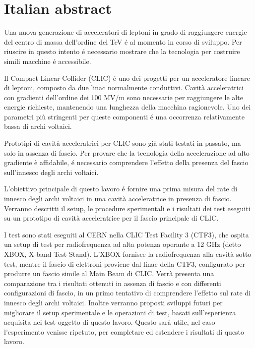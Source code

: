 \chapter*{Italian abstract}

Una nuova generazione di acceleratori di leptoni in grado di raggiungere energie del centro di massa dell'ordine del TeV é al momento in corso di sviluppo. Per riuscire in questo intento é necessario mostrare che la tecnologia per costruire simili macchine é accessibile.

Il Compact Linear Collider (CLIC) é uno dei progetti per un acceleratore lineare di leptoni, composto da due linac normalmente conduttivi. Cavit\`a acceleratrici con gradienti dell'ordine dei 100 MV/m sono necessarie per raggiungere le alte energie richieste, mantenendo una lunghezza della macchina ragionevole. Uno dei parametri pi\`u stringenti per queste componenti é una occorrenza relativamente bassa di archi voltaici.

Prototipi di cavit\`a acceleratrici per CLIC sono gi\`a stati testati in passato, ma solo in assenza di fascio. Per provare che la tecnologia della accelerazione ad alto gradiente \`e affidabile, é necessario comprendere l'effetto della presenza del fascio sull'innesco degli archi voltaici.

L'obiettivo principale di questo lavoro é fornire una prima misura del rate di innesco degli archi voltaici in una cavit\`a acceleratrice in presenza di fascio. Verranno descritti il setup, le procedure sperimentali e i risultati dei test eseguiti su un prototipo di cavit\`a acceleratrice per il fascio principale di CLIC.

I test sono stati eseguiti al CERN nella CLIC Test Facility 3 (CTF3), che ospita un setup di test per radiofrequenza ad alta potenza operante a 12 GHz (detto XBOX, X-band Test Stand). L'XBOX fornisce la radiofrequenza alla cavit\`a sotto test, mentre il fascio di elettroni proviene dal linac della CTF3, configurato per produrre un fascio simile al Main Beam di CLIC. Verr\`a presenta una comparazione tra i risultati ottenuti in assenza di fascio e con differenti configurazioni di fascio, in un primo tentativo di comprendere l'effetto sul rate di innesco degli archi voltaici. Inoltre verranno proposti sviluppi futuri per migliorare il setup sperimentale e le operazioni di test, basati sull'esperienza acquisita nei test oggetto di questo lavoro. Questo sar\`a utile, nel caso l'esperimento venisse ripetuto, per completare ed estendere i risultati di questo lavoro.